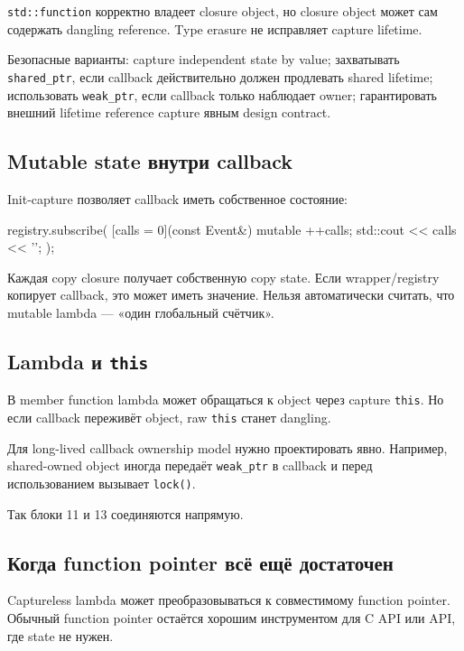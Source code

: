 \texttt{std::function} корректно владеет closure object, но closure object может
сам содержать dangling reference. Type erasure не исправляет capture lifetime.

Безопасные варианты:
capture independent state by value; захватывать \texttt{shared\_ptr}, если callback действительно должен продлевать shared lifetime; использовать \texttt{weak\_ptr}, если callback только наблюдает owner; гарантировать внешний lifetime reference capture явным design contract.

\subsection{Mutable state внутри callback}

Init-capture позволяет callback иметь собственное состояние:

\begin{cppcode}
registry.subscribe(
    [calls = 0](const Event&) mutable {
        ++calls;
        std::cout << calls << '\n';
    }
);
\end{cppcode}

Каждая copy closure получает собственную copy state. Если wrapper/registry
копирует callback, это может иметь значение. Нельзя автоматически считать,
что mutable lambda --- «один глобальный счётчик».

\subsection{Lambda и \texttt{this}}

В member function lambda может обращаться к object через capture \texttt{this}.
Но если callback переживёт object, raw \texttt{this} станет dangling.

Для long-lived callback ownership model нужно проектировать явно. Например,
shared-owned object иногда передаёт \texttt{weak\_ptr} в callback и перед
использованием вызывает \texttt{lock()}.

Так блоки 11 и 13 соединяются напрямую.

\subsection{Когда function pointer всё ещё достаточен}

Captureless lambda может преобразовываться к совместимому function pointer.
Обычный function pointer остаётся хорошим инструментом для C API или API, где
state не нужен.

